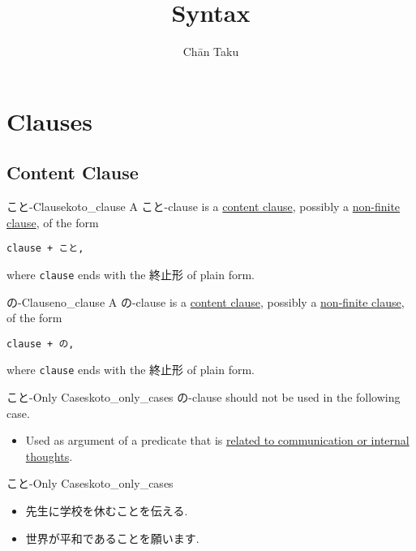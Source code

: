 \documentclass{article}
\title{Syntax}
\author{Ch\=an Taku}
\begin{document}
\maketitle

\section{Clauses}

\subsection{Content Clause}

\begin{definition}{こと-Clause}{koto_clause}
    A こと-clause is a \href{https://en.wikipedia.org/wiki/Content_clause}{content clause}, possibly a \href{https://en.wikipedia.org/wiki/Non-finite_clause}{non-finite clause}, of the form
    \begin{center}
        \texttt{clause + こと,}
    \end{center}
    where \texttt{clause} ends with the 終止形 of plain form.
\end{definition}

\begin{definition}{の-Clause}{no_clause}
    A の-clause is a \href{https://en.wikipedia.org/wiki/Content_clause}{content clause}, possibly a \href{https://en.wikipedia.org/wiki/Non-finite_clause}{non-finite clause}, of the form
    \begin{center}
        \texttt{clause + の,}
    \end{center}
    where \texttt{clause} ends with the 終止形 of plain form.
\end{definition}

\begin{proposition}{こと-Only Cases}{koto_only_cases}
    の-clause should not be used in the following case.
    \begin{itemize}
        \item Used as argument of a predicate that is \href{https://www.wasabi-jpn.com/japanese-grammar/nominalizers-koto-and-no/}{related to communication or internal thoughts}.
    \end{itemize}
\end{proposition}

\begin{example}{こと-Only Cases}{koto_only_cases}
    \begin{itemize}
        \item 先生に学校を休む{\color{cyan}こと}を伝える.
        \item 世界が平和である{\color{cyan}こと}を願います.
    \end{itemize}
\end{example}
\end{document}
